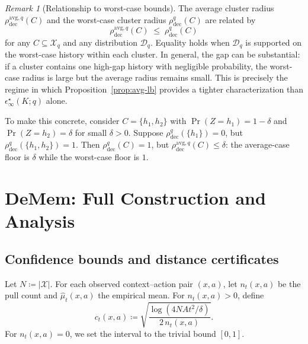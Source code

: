\documentclass{article}
\theoremstyle{plain}
\theoremstyle{definition}
\theoremstyle{remark}
\newtheorem{remark}{Remark}
\newcommand{\cX}{\mathcal{X}}
\newcommand{\cD}{\mathcal{D}}
\newcommand{\eps}{\epsilon}
\begin{document}
\begin{remark}[Relationship to worst-case bounds]
\label{rem:avg-vs-worst}
The average cluster radius \(\rho_{\mathrm{dec}}^{\mathrm{avg},q}(C)\) and
the worst-case cluster radius \(\rho_{\mathrm{dec}}^q(C)\) are related by
\[
\rho_{\mathrm{dec}}^{\mathrm{avg},q}(C)
\;\le\;
\rho_{\mathrm{dec}}^q(C)
\]
for any \(C\subseteq\cX_q\) and any distribution \(\cD_q\).
Equality holds when \(\cD_q\) is supported on the worst-case history within
each cluster. In general, the gap can be substantial: if a cluster contains
one high-gap history with negligible probability, the worst-case radius is
large but the average radius remains small. This is precisely the regime in
which Proposition~\ref{prop:avg-lb} provides a tighter characterization than
\(\eps^\star_\infty(K;q)\) alone.

To make this concrete, consider \(C=\{h_1,h_2\}\) with
\(\Pr(Z=h_1)=1-\delta\) and \(\Pr(Z=h_2)=\delta\) for small \(\delta>0\).
Suppose \(\rho_{\mathrm{dec}}^q(\{h_1\})=0\), but
\(\rho_{\mathrm{dec}}^q(\{h_1,h_2\})=1\). Then
\(\rho_{\mathrm{dec}}^q(C)=1\), but
\(\rho_{\mathrm{dec}}^{\mathrm{avg},q}(C)\le\delta\): the average-case floor
is \(\delta\) while the worst-case floor is \(1\).
\end{remark}



\section{DeMem: Full Construction and Analysis}
\label{app:DeMem}

\subsection{Confidence bounds and distance certificates}
\label{app:certificates}

Let \(N\coloneqq|\cX|\). For each observed context--action pair
\((x,a)\), let \(n_t(x,a)\) be the pull count and \(\hat\mu_t(x,a)\)
the empirical mean. For \(n_t(x,a)>0\), define
\begin{equation}
\label{eq:conf-radius-app}
c_t(x,a)
\coloneqq
\sqrt{
\frac{\log(4NAt^2/\delta)}
{2\,n_t(x,a)}
}.
\end{equation}
For \(n_t(x,a)=0\), we set the interval to the trivial bound
\([0,1]\).
\end{document}
